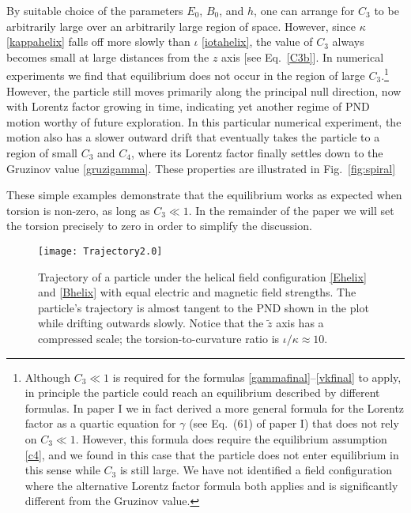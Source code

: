 \documentclass[amsmath,amssymb,nofootinbib,notitlepage,superscriptaddress,twocolumn]{revtex4-2}
\begin{document}
 By suitable choice of the parameters $E_0$, $B_0$, and $h$, one can arrange for $C_3$ to be arbitrarily large over an arbitrarily large region of space.  However, since $\kappa$ \eqref{kappahelix} falls off more slowly than $\iota$ \eqref{iotahelix}, the value of $C_3$ always becomes small at large distances from the $z$ axis [see Eq.~\eqref{C3b}].  In numerical experiments we find that equilibrium does not occur in the region of large $C_3$.\footnote{Although $C_3\ll1$ is required for the formulas \eqref{gammafinal}--\eqref{vkfinal} to apply, in principle the particle could reach an equilibrium described by different formulas.  In paper I we in fact derived a more general formula for the Lorentz factor as a quartic equation for $\gamma$ (see Eq.~(61) of paper I) that does not rely on $C_3 \ll 1$.  However, this formula does require the equilibrium assumption \eqref{c4}, and we found in this case that the particle does not enter equilibrium in this sense while $C_3$ is still large.  We have not identified a field configuration where the alternative Lorentz factor formula both applies and is significantly different from the Gruzinov value.} 
 However, the particle still moves primarily along the principal null direction, now with Lorentz factor growing in time, indicating yet another regime of PND motion worthy of future exploration.  In this particular numerical experiment, the motion also has a slower outward drift that eventually takes the particle to a region of small $C_3$ and $C_4$, where its Lorentz factor finally settles down to the Gruzinov value \eqref{gruzigamma}. These properties are illustrated in Fig.~\ref{fig:spiral}
 
 These simple examples demonstrate that the equilibrium works as expected when torsion is non-zero, as long as $C_3 \ll 1$.  In the remainder of the paper we will set the torsion precisely to zero in order to simplify the discussion.

\begin{figure}
    \centering
    \texttt{[image: Trajectory2.0]}\\
    \caption{Trajectory of a particle under the helical field configuration \eqref{Ehelix} and \eqref{Bhelix} with equal electric and magnetic field strengths.  The particle's trajectory is almost tangent to the PND shown in the plot while drifting outwards slowly.  Notice that the $\tilde{z}$ axis has a compressed scale; the torsion-to-curvature ratio is $\iota/\kappa \approx 10$.
    }
    \label{fig:traj}
\end{figure}
\end{document}

